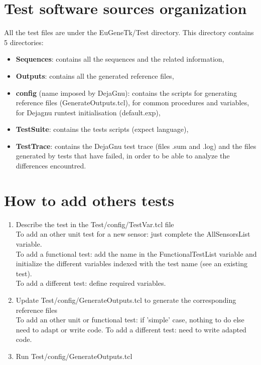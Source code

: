 \documentclass[a4paper,11pt]{article}
\begin{document}
\section{Test software sources organization}
All the test files are under the EuGeneTk/Test directory.
This directory contains 5 directories:
\begin{itemize}
\item {\bf Sequences}: contains all the sequences and the related information,
\item {\bf Outputs}: contains all the generated reference files,
\item {\bf config} (name imposed by DejaGnu): contains the scripts for generating reference files (GenerateOutputs.tcl), for common procedures and variables, for Dejagnu runtest initialisation (default.exp),
\item {\bf TestSuite}: contains the tests scripts (expect language),
\item {\bf TestTrace}: contains the DejaGnu test trace (files .sum and .log) and the files generated by tests that have failed, in order to be able to analyze the differences encountred.
\end{itemize}

\section{How to add others tests}
\begin{enumerate}
\item Describe the test in the Test/config/TestVar.tcl file\\
To add an other unit test for a new sensor: just complete the AllSensorsList variable.\\
To add a functional test: add the name in the FunctionalTestList variable and initialize the different variables indexed with the test name (see an existing test).\\
To add a different test: define required variables.\\
\item Update Test/config/GenerateOutputs.tcl to generate the corresponding reference files\\
To add an other unit or functional test: if 'simple' case, nothing to do else need to adapt or write code.
To add a different test: need to write adapted code.
\item Run Test/config/GenerateOutputs.tcl
\end{enumerate}
\end{document}
